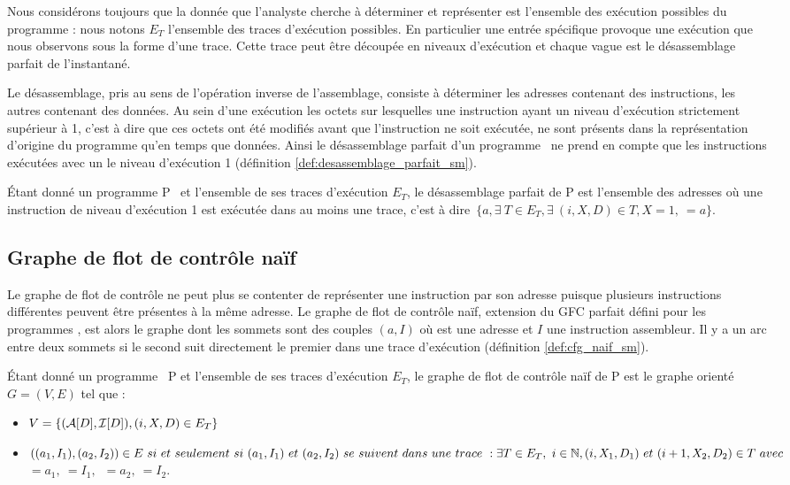 Nous considérons toujours que la donnée que l'analyste cherche à
déterminer et représenter est l'ensemble des exécution possibles du
programme : nous notons $E_T$ l'ensemble des traces d'exécution possibles.
En particulier une entrée spécifique provoque une exécution que nous observons sous la forme d'une trace.
Cette trace peut être découpée en niveaux d'exécution et chaque vague est le désassemblage parfait de l'instantané.

Le désassemblage, pris au sens de l'opération inverse de l'assemblage,
consiste à déterminer les adresses contenant des instructions, les
autres contenant des données.
Au sein d'une exécution les octets sur lesquelles une instruction ayant
un niveau d'exécution strictement supérieur à 1, c'est à dire que ces
octets ont été modifiés avant que l'instruction ne soit exécutée, ne
sont présents dans la représentation d'origine du programme qu'en temps
que données.
Ainsi le désassemblage parfait d'un programme \sm\ ne prend en compte
que les instructions exécutées avec un le niveau d'exécution 1
(définition \ref{def:desassemblage_parfait_sm}).

\begin{defi}
 Étant donné un programme P \sm\ et l'ensemble de ses traces d'exécution
$E_T$, le désassemblage parfait de P est l'ensemble des adresses où une
instruction de niveau d'exécution 1 est exécutée dans au moins une
trace, c'est à dire~$\{a, \exists\ T\in E_T, \exists\ (i, X, D)\in T, X=1,\ $$=a\}$.
\label{def:desassemblage_parfait_sm}
\end{defi}

\subsection{Graphe de flot de contrôle naïf}
Le graphe de flot de contrôle ne peut plus se contenter de représenter
une instruction par son adresse puisque plusieurs instructions
différentes peuvent être présentes à la même adresse.
Le graphe de flot de contrôle naïf, extension du GFC parfait défini pour les programmes \nsms, est alors le graphe dont les
sommets sont des couples $(a, I)$ où  est une adresse et $I$ une
instruction assembleur. Il y a un arc entre deux sommets si le second
suit directement le premier dans une trace d'exécution (définition
\ref{def:cfg_naif_sm}).

\begin{defi}
 Étant donné un programme \sm\ P et l'ensemble de ses traces d'exécution
$E_T$, le graphe de flot de contrôle naïf de P est le graphe orienté
$G=(V, E)$ tel que :
 \begin{itemize}
  \item $V=\{(\mathcal A[D], \mathcal I[D]),  (i, X, D)\in E_T\}$
  \item $((a_1, I_1), (a_2, I_2))\in E\ si\ et\ seulement\ si\ (a_1,
I_1)\ et\ (a_2, I_2)\ se\ suivent\ dans\ une\ trace\ : \exists T\in
E_T,\ i\in \BN, (i, X_1, D_1)\ et\ (i+1, X_2, D_2)\in T\ avec\
$$=a_1,\ $$=I_1,$~$=a_2,\ $$=I_2$.
 \end{itemize}
\label{def:cfg_naif_sm}
\end{defi}

